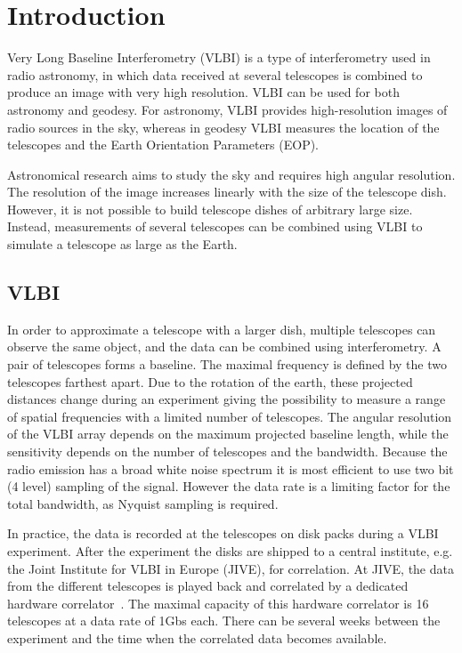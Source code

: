 \section{Introduction}
Very Long Baseline Interferometry (VLBI) \cite{VLBIbook} is a type of
interferometry used in radio astronomy, in which data received at
several telescopes is combined to produce an image with very high
resolution. VLBI can be used for both astronomy and geodesy.  For
astronomy, VLBI provides high-resolution images of radio sources in
the sky, whereas in geodesy VLBI measures the location of the
telescopes and the Earth Orientation Parameters (EOP).

Astronomical research aims to study the sky and requires high angular
resolution. The resolution of the image increases linearly with the
size of the telescope dish. However, it is not possible to build
telescope dishes of arbitrary large size.  Instead, measurements of
several telescopes can be combined using VLBI to simulate a telescope
as large as the Earth. 

\subsection{VLBI}
In order to approximate a telescope with a larger dish, multiple
telescopes can observe the same object, and the data can be combined
using interferometry. A pair of telescopes forms a baseline. The
maximal frequency is defined by the two telescopes farthest apart. Due
to the rotation of the earth, these projected distances change during
an experiment giving the possibility to measure a range of spatial
frequencies with a limited number of telescopes. The angular
resolution of the VLBI array depends on the maximum projected baseline
length, while the sensitivity depends on the number of telescopes and
the bandwidth. Because the radio emission has a broad white noise
spectrum it is most efficient to use two bit (4 level) sampling of the
signal. However the data rate is a limiting factor for the total
bandwidth, as Nyquist sampling is required.

In practice, the data is recorded at the telescopes on disk packs
during a VLBI experiment. After the experiment the disks are shipped
to a central institute, e.g. the Joint Institute for VLBI in Europe
(JIVE), for correlation. At JIVE, the data from the different
telescopes is played back and correlated by a dedicated hardware
correlator~\cite{EVNCorrelator}. The maximal capacity of this hardware
correlator is 16 telescopes at a data rate of 1Gbs each. There can be
several weeks between the experiment and the time when the correlated
data becomes available.

